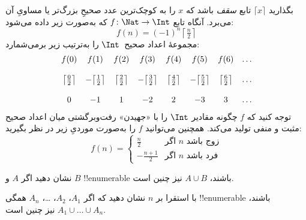 \documentclass[../../../include/open-logic-section]{subfiles}
\begin{document}
\begin{ex}
بگذارید $\lceil x \rceil$ تابع \emph{سقف} باشد که $x$ را به کوچک‌ترین عدد صحیحِ بزرگ‌تر یا مساویِ آن می‌برد. آنگاه تابع $f \colon \Nat \to \Int$
که به‌صورت زیر داده می‌شود:
\[
  f(n) = (-1)^{n} \left\lceil\tfrac{n}{2}\right\rceil
\]
مجموعهٔ اعداد صحیح~$\Int$ را به‌ترتیب زیر برمی‌شمارد:
\[
\begin{array}{c c c c c c c c}
f(0) & f(1) & f(2) & f(3) & f(4) & f(5) & f(6) & \dots \\ \\
\big\lceil \tfrac{0}{2} \big\rceil & -\big\lceil \tfrac{1}{2}\big\rceil &  \big\lceil \tfrac{2}{2} \big\rceil & -\big\lceil \tfrac{3}{2} \big\rceil & \big\lceil \tfrac{4}{2} \big\rceil  & -\big\lceil \tfrac{5}{2}\big\rceil & \big\lceil \tfrac{6}{2} \big\rceil & \dots \\ \\
0 & -1 & 1 & -2 & 2 & -3 & 3& \dots
\end{array}
\]
توجه کنید که $f$ چگونه مقادیر $\Int$ را با «جهیدن» رفت‌وبرگشتی
میان اعداد صحیح مثبت و منفی تولید می‌کند. همچنین می‌توانید $f$ را
به‌صورت موردیِ زیر در نظر بگیرید:
\[
f(n) = \begin{cases}
  \frac{n}{2} & \text{اگر $n$ زوج باشد}\\
  -\frac{n+1}{2} & \text{اگر $n$ فرد باشد}
  \end{cases}
\]
\end{ex}

\begin{prob}
نشان دهید اگر $A$ و $B$ !!{enumerable} باشند، $A \cup B$ نیز چنین است.
\end{prob}

\begin{prob}
با استقرا بر $n$ نشان دهید که اگر $A_1$، $A_2$، \dots، $A_n$ همگی
!!{enumerable} باشند، $A_1 \cup \dots \cup A_n$ نیز چنین است.
\end{prob}
\end{document}
